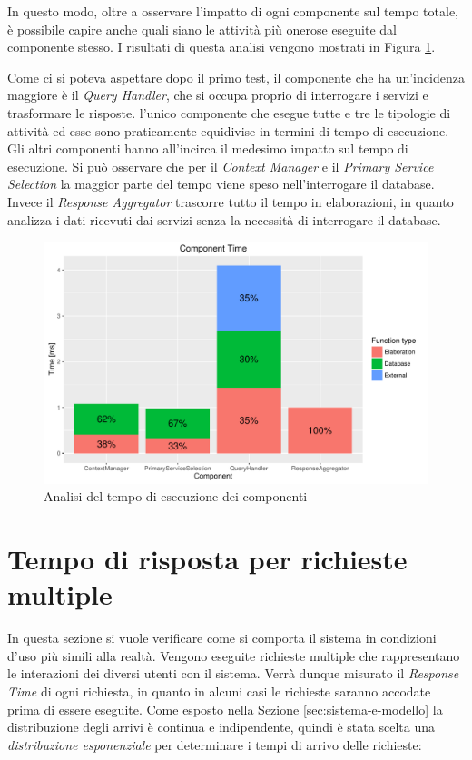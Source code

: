 In questo modo, oltre a osservare l'impatto di ogni componente sul tempo totale, è possibile capire anche quali siano le attività più onerose eseguite dal componente stesso. I risultati di questa analisi vengono mostrati in Figura \ref{fig:component-time}.

Come ci si poteva aspettare dopo il primo test, il componente che ha un'incidenza maggiore è il \emph{Query Handler}, che si occupa proprio di interrogare i servizi e trasformare le risposte. \upe l'unico componente che esegue tutte e tre le tipologie di attività ed esse sono praticamente equidivise in termini di tempo di esecuzione. Gli altri componenti hanno all'incirca il medesimo impatto sul tempo di esecuzione. Si può osservare che per il \emph{Context Manager} e il \emph{Primary Service Selection} la maggior parte del tempo viene speso nell'interrogare il database. Invece il \emph{Response Aggregator} trascorre tutto il tempo in elaborazioni, in quanto analizza i dati ricevuti dai servizi senza la necessità di interrogare il database.

\clearpage

\begin{figure}[ht]
	\centering
	\includegraphics[width=\textwidth]{7-performance/Immagini/component_time.pdf}
	\caption{Analisi del tempo di esecuzione dei componenti}\label{fig:component-time}
\end{figure}

\section{Tempo di risposta per richieste multiple\label{sec:analisi-response-time}}

In questa sezione si vuole verificare come si comporta il sistema in condizioni d'uso più simili alla realtà. Vengono eseguite richieste multiple che rappresentano le interazioni dei diversi utenti con il sistema. Verrà dunque misurato il \emph{Response Time} di ogni richiesta, in quanto in alcuni casi le richieste saranno accodate prima di essere eseguite. Come esposto nella Sezione \ref{sec:sistema-e-modello} la distribuzione degli arrivi è continua e indipendente, quindi è stata scelta una \emph{distribuzione esponenziale} per determinare i tempi di arrivo delle richieste:

